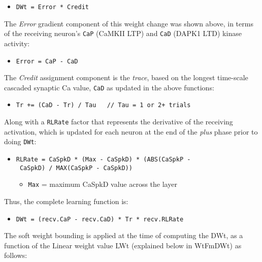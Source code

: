 \documentclass[11pt,twoside]{article}
\newif\myifpdf
\begin{document}
\begin{itemize}
\tightlist
\item
  \texttt{DWt\ =\ Error\ *\ Credit}
\end{itemize}

The \emph{Error} gradient component of this weight change was shown
above, in terms of the receiving neuron's \texttt{CaP} (CaMKII LTP) and
\texttt{CaD} (DAPK1 LTD) kinase activity:

\begin{itemize}
\tightlist
\item
  \texttt{Error\ =\ CaP\ -\ CaD}
\end{itemize}

The \emph{Credit} assignment component is the \emph{trace}, based on the
longest time-scale cascaded synaptic Ca value, \texttt{CaD} as updated
in the above functions:

\begin{itemize}
\tightlist
\item
  \texttt{Tr\ +=\ (CaD\ -\ Tr)\ /\ Tau\ \ \ //\ Tau\ =\ 1\ or\ 2+\ trials}
\end{itemize}

Along with a \texttt{RLRate} factor that represents the derivative of
the receiving activation, which is updated for each neuron at the end of
the \emph{plus} phase prior to doing \texttt{DWt}:

\begin{itemize}
\tightlist
\item
  \texttt{RLRate\ =\ CaSpkD\ *\ (Max\ -\ CaSpkD)\ *\ (ABS(CaSpkP\ -\ CaSpkD)\ /\ MAX(CaSpkP\ -\ CaSpkD))}

  \begin{itemize}
  \tightlist
  \item
    \texttt{Max} = maximum CaSpkD value across the layer
  \end{itemize}
\end{itemize}

Thus, the complete learning function is:

\begin{itemize}
\tightlist
\item
  \texttt{DWt\ =\ (recv.CaP\ -\ recv.CaD)\ *\ Tr\ *\ recv.RLRate}
\end{itemize}

The soft weight bounding is applied at the time of computing the DWt, as
a function of the Linear weight value LWt (explained below in WtFmDWt)
as follows:

\begin{Shaded}
\begin{Highlighting}[]
    \OperatorTok{\textgreater{}}  \OperatorTok{\{}
\OperatorTok{*=} \OperatorTok{(} \OperatorTok{{-}}\OperatorTok{)}
    \OperatorTok{\}}  \OperatorTok{\{}
\OperatorTok{*=}
    \OperatorTok{\}}
\end{Highlighting}
\end{Shaded}
\end{document}
